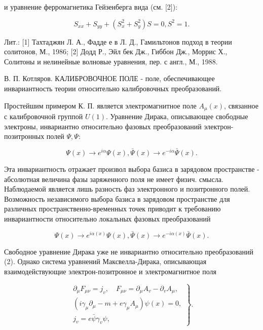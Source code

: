 \documentclass[10pt]{article}
\begin{document}
и уравнение ферромагнетика Гейзенберга вида (см. [2]):



\[

S_{x x}+S_{y y}+\left(S_{x}^{2}+S_{y}^{2}\right) S=0, S^{2}=1 .

\]



Лит.: [1] Тахтаджян Л. А., Фадде е в Л. Д., Гамильтонов подход в теории солитонов, М., 1986; [2] Додд Р., Эйл бек Дж., Гиббон Дж., Моррис Х., Солитоны и нелинейные волновые уравнения, пер. с англ., М., 1988.



В. П. Котляров. КАЛИБРОВОЧНОЕ ПОЛЕ - поле, обеспечивающее инвариантность теории относительно калибровочных преобразований.



Простейшим примером К. П. является электромагнитное поле $A_{\mu}(x)$, связанное с калибровочной группой $U(1)$. Уравнение Дирака, описывающее свободные электроны, инвариантно относительно фазовых преобразований электрон-позитронных полей $\Psi, \Psi:$



\[

\Psi(x) \rightarrow e^{i \alpha} \Psi(x), \bar{\Psi}(x) \rightarrow e^{-i \alpha} \bar{\Psi}(x) .

\]



Эта инвариантность отражает произвол выбора базиса в зарядовом пространстве - абсолютная величина фазы заряженного поля не имеет физич. смысла. Наблюдаемой является лишь разность фаз электронного и позитронного полей. Возможность независимого выбора базиса в зарядовом пространстве для различных пространственно-временных точек приводит к требованию инвариантности относительно локальных фазовых преобразований



\[

\Psi(x) \rightarrow e^{i \alpha(x)} \Psi(x), \bar{\Psi}(x) \rightarrow e^{-i \alpha(x)} \bar{\Psi}(x) .

\]



Свободное уравнение Дирака уже не инвариантно относительно преобразований (2). Однако система уравнений Максвелла-Дирака, описывающая взаимодействующие электрон-позитронное и электромагнитное поля



\[

\left.\begin{array}{c}

\partial_{\mu} F_{\mu \nu}=j_{v}, \quad F_{\mu \nu}=\partial_{\mu} A_{v}-\partial_{v} A_{\mu}, \\

\left(i \gamma_{\mu} \partial_{\mu}-m+e \gamma_{\mu} A_{\mu}\right) \psi(x)=0, \\

j_{v}=e \bar{\psi} \gamma_{v} \psi,

\end{array}\right\} .

\]
\end{document}
